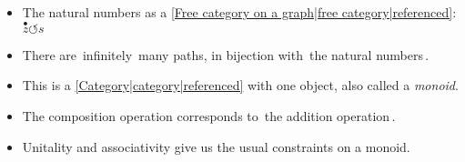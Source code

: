 
\begin{itemize}
    \item The natural numbers as a \ref{Free category on a graph|free category|referenced}: $\boxed{\overset{\bullet}{z}\circlearrowleft s}$
    \item There are \,infinitely\, many paths, in bijection with \,the natural numbers\,.
    \item This is a \ref{Category|category|referenced} with one object, also called a \emph{monoid}.
    \item The composition operation corresponds to \,the addition operation\,.
    \item Unitality and associativity give us the usual constraints on a monoid.
  \end{itemize}
